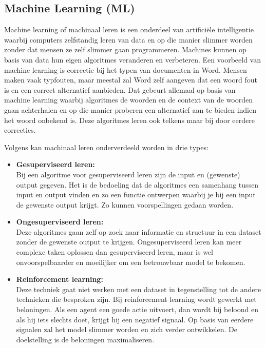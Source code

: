 \subsection{Machine Learning (ML)}
\label{subsec:begrippen-ml}


Machine learning of machinaal leren is een onderdeel van artificiële intelligentie waarbij computers zelfstandig leren van data en op die manier slimmer worden zonder dat mensen ze zelf slimmer gaan programmeren. Machines kunnen op basis van data hun eigen algoritmes veranderen en verbeteren. Een voorbeeld van machine learning is correctie bij het typen van documenten in Word. Mensen maken vaak typfouten, maar meestal zal Word zelf aangeven dat een woord fout is en een correct alternatief aanbieden. Dat gebeurt allemaal op basis van machine learning waarbij algoritmes de woorden en de context van de woorden gaan achterhalen en op die manier proberen een alternatief aan te bieden indien het woord onbekend is. Deze algoritmes leren ook telkens maar bij door eerdere correcties.


Volgens \textcite{Lievens2019} kan machinaal leren onderverdeeld worden in drie types:

\begin{itemize}
    \item \textbf{Gesuperviseerd leren:} \\
    
    Bij een algoritme voor gesuperviseerd leren zijn de input en (gewenste) output gegeven. Het is de bedoeling dat de algoritmes een samenhang tussen input en output vinden en zo een functie ontwerpen waarbij je bij een input de gewenste output krijgt. Zo kunnen voorspellingen gedaan worden. \\
    
    \item \textbf{Ongesuperviseerd leren:} \\
    
    Deze algoritmes gaan zelf op zoek naar informatie en structuur in een dataset zonder de gewenste output te krijgen. Ongesuperviseerd leren kan meer complexe taken oplossen dan gesuperviseerd leren, maar is wel onvoorspelbaarder en moeilijker om een betrouwbaar model te bekomen. \\
    
    \item \textbf{Reinforcement learning:} \\
    
    Deze techniek gaat niet werken met een dataset in tegenstelling tot de andere technieken die besproken zijn. Bij reinforcement learning wordt gewerkt met beloningen. Als een agent een goede actie uitvoert, dan wordt bij beloond en als hij iets slechts doet, krijgt hij een negatief signaal. Op basis van eerdere signalen zal het model slimmer worden en zich verder ontwikkelen. De doelstelling is de beloningen maximaliseren. \\
\end{itemize}

